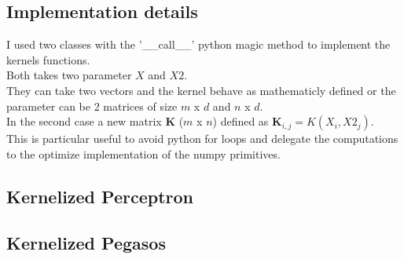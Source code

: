 \subsection{Implementation details}
I used two classes with the '\_\_call\_\_' python magic method to implement the kernels functions.\\
Both takes two parameter $X$ and $X2$.\\
They can take two vectors and the kernel behave as mathematicly defined or the parameter can be 2 matrices of size $m$ x $d$ and $n$ x $d$.\\
In the second case a new matrix $\boldsymbol{K}$ ($m$ x $n$) defined as $\boldsymbol{K}_{i, j} = K(X_i, X2_j)$.\\
This is particular useful to avoid python for loops and delegate the computations to the optimize implementation of the numpy primitives.\\


\subsection{Kernelized Perceptron}





\subsection{Kernelized Pegasos}

